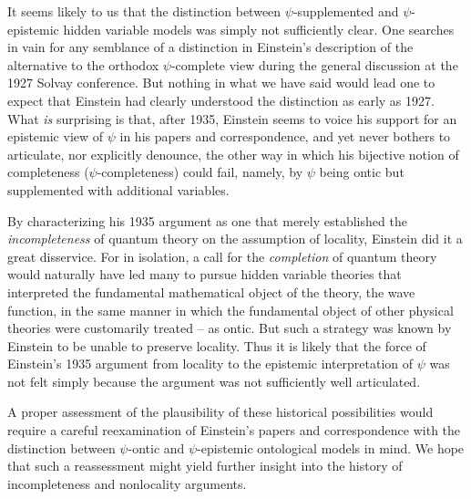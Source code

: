 \documentclass[aps,nofootinbib,12pt]{revtex4-2}
\begin{document}
It seems likely to us that the distinction between
$\psi$-supplemented and $\psi$-epistemic hidden variable models was
simply not sufficiently clear. One searches in vain for any
semblance of a distinction in Einstein's description of the
alternative to the orthodox $\psi$-complete view during the general
discussion at the 1927 Solvay conference. But nothing in what we
have said would lead one to expect that Einstein had clearly
understood the distinction as early as 1927. What \textit{is}
surprising is that, after 1935, Einstein seems to voice his support
for an epistemic view of $\psi$ in his papers and correspondence,
and yet never bothers to articulate, nor explicitly denounce, the
other way in which his bijective notion of completeness
($\psi$-completeness) could fail, namely, by $\psi$ being ontic but
supplemented with additional variables.

By characterizing his 1935 argument as one that merely established
the \textit{incompleteness} of quantum theory on the assumption of
locality, Einstein did it a great disservice. For in isolation, a
call for the \textit{completion} of quantum theory would naturally
have led many to pursue hidden variable theories that interpreted
the fundamental mathematical object of the theory, the wave
function, in the same manner in which the fundamental object of
other physical theories were customarily treated -- as ontic. But
such a strategy was known by Einstein to be unable to preserve
locality.
Thus it is likely that the force of Einstein's 1935 argument from
locality to the epistemic interpretation of $\psi$ was not felt
simply because the argument was not sufficiently well articulated.

A proper assessment of the plausibility of these historical
possibilities would require a careful reexamination of Einstein's
papers and correspondence with the distinction between $\psi$-ontic
and $\psi$-epistemic ontological models in mind. We hope that such a
reassessment might yield further insight into the history of
incompleteness and nonlocality arguments.
\end{document}
